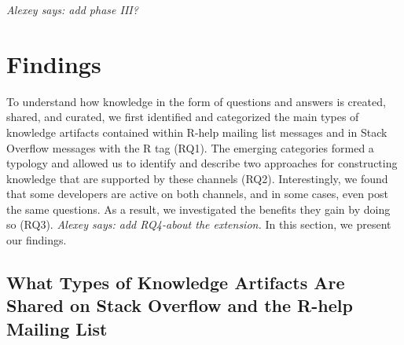 \documentclass[smallextended]{svjour3}       %
\newcommand{\alexey}[1]{{\color{cyan}\emph{Alexey says: #1}}\xspace}
\newcommand{\alexey}[1]{}
\newcommand{\SO}{Stack Overflow\xspace}
\newcommand{\RH}{R-help\xspace}
\begin{document}
\alexey{add phase III?}

 \section{Findings}
\label{cha:findings}
To understand how knowledge in the form of questions and answers is created, shared, and curated, we first identified and categorized the main types of knowledge artifacts contained within \RH mailing list messages and in \SO messages with the R tag (RQ1). The emerging categories formed a typology and allowed us to identify and describe two approaches for constructing knowledge that are supported by these channels (RQ2). Interestingly, we found that some developers are active on both channels, and in some cases, even post the same questions. As a result, we investigated the benefits they gain by doing so (RQ3). \alexey{add RQ4-about the extension.} In this section, we present our findings.

\subsection{What Types of Knowledge Artifacts Are Shared on \SO and the \RH Mailing List}
\label{cha:findings-types}
\end{document}

